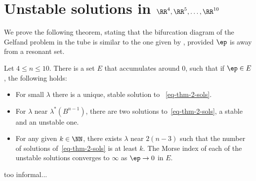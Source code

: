 \section{Unstable solutions in $\RR^4,\RR^5,\dots,\RR^{10}$}

We prove the following theorem, stating that the bifurcation diagram of the
Gelfand problem in the tube is similar to the one given by
\cite{stable-solutions-elliptic}, provided $\ep$ is away from a resonant
set.

\begin{theorem}
    Let $4\leq n \leq 10$. There is a set $E$ that accumulates around 0, such
    that if $\ep\in E$, the following holds: 
    \begin{itemize}
        \item For small $\lambda$ there is a unique, stable solution to
           ~\ref{eq-thm-2-sols}.
        \item For $\lambda$ near $\lambda^\ast(B^{n-1})$, there are two
            solutions to~\ref{eq-thm-2-sols}, a stable and an unstable one.
        \item For any given $k\in \NN$, there exists $\lambda$ near $2(n-3)$
            such that the number of solutions of~\ref{eq-thm-2-sols} is at least
            $k$. The Morse index of each of the unstable solutions converges to
            $\infty$ as $\ep\to 0$ in $E$.
    \end{itemize}
\end{theorem}

{\color{red} too informal...}
